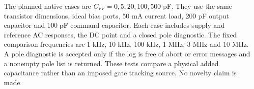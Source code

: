 The planned native cases are $C_{FF}=0,5,20,100,500$ pF. They use the
same transistor dimensions, ideal bias ports, 50 mA current load,
200 pF output capacitor and 100 pF command capacitor. Each case includes
supply and reference AC responses, the DC point and a closed pole
diagnostic. The fixed comparison frequencies are 1 kHz, 10 kHz,
100 kHz, 1 MHz, 3 MHz and 10 MHz. A pole diagnostic is accepted only if
the log is free of abort or error messages and a nonempty pole list is
returned. These tests compare a physical added capacitance rather than
an imposed gate tracking source. No novelty claim is made.
